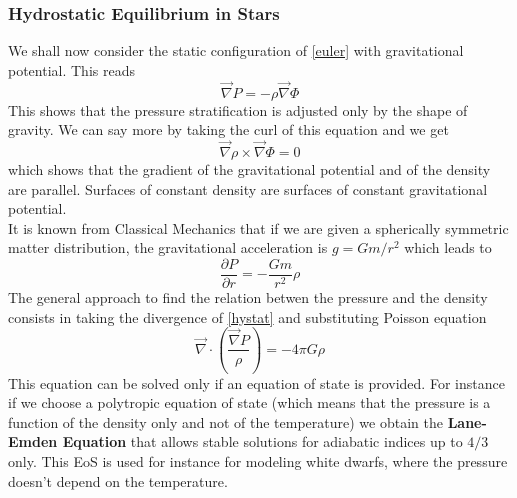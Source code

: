 \documentclass[11pt]{article}
\numberwithin{equation}{section}
\begin{document}
\subsubsection{Hydrostatic Equilibrium in Stars}
We shall now consider the static configuration of \ref{euler} with gravitational potential. This reads
\begin{equation} \label{hystat}
	\vec \nabla P = - \rho \vec \nabla \Phi
\end{equation}
This shows that the pressure stratification is adjusted only by the shape of gravity. We can say more by taking the curl of this equation and we get
$$
\vec \nabla \rho \times  \vec \nabla \Phi =0
$$
which shows that the gradient of the gravitational potential and of the density are parallel. Surfaces of constant density are surfaces of constant gravitational potential.\\
It is known from Classical Mechanics that if we are given a spherically symmetric matter distribution, the gravitational acceleration is $g=Gm/r^2$ which leads to
\begin{equation}\label{2.4}
	\frac{\partial P}{\partial r}= - \frac{G m}{r^2} \rho
\end{equation}
The general approach to find the relation betwen the pressure and the density consists in taking the divergence of \ref{hystat} and substituting Poisson equation 
$$
\vec \nabla \cdot \left ( \frac{\vec \nabla P}{\rho} \right ) = - 4 \pi G \rho 
$$
This equation can be solved only if an equation of state is provided. For instance if we choose a polytropic equation of state (which means that the pressure is a function of the density only and not of the temperature) we obtain the \textbf{Lane-Emden Equation} that allows stable solutions for adiabatic indices up to $4/3$ only. This EoS is used for instance for modeling white dwarfs, where the pressure doesn't depend on the temperature. \\ 
\end{document}

